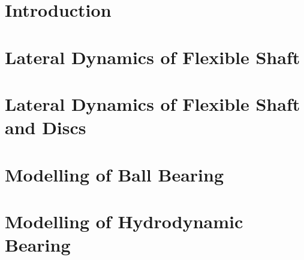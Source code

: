 \section{Introduction}

\section{Lateral Dynamics of Flexible Shaft}


\section{Lateral Dynamics of Flexible Shaft and Discs}


\section{Modelling of Ball Bearing}


\section{Modelling of Hydrodynamic Bearing}


